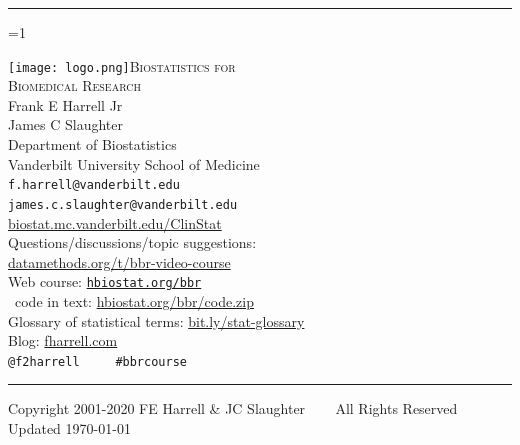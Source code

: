 \documentclass{report}
\begin{document}
\author{ }

\noindent\rule{\linewidth}{1mm}

\def\originalBBR{1}  %
\ifnum\originalBBR=1

\begin{flushright}
\Huge
\texttt{[image: logo.png]}\hfill\textsc{Biostatistics for\\Biomedical Research}\\[2ex]
\huge Frank E Harrell Jr \\ James C Slaughter \\
\Large
Department of Biostatistics \\
Vanderbilt University School of Medicine \\
\texttt{f.harrell@vanderbilt.edu} \\ \texttt{james.c.slaughter@vanderbilt.edu}
\\[2ex] \href{http://biostat.mc.vanderbilt.edu/wiki/Main/ClinStat}{biostat.mc.vanderbilt.edu/ClinStat}\\
Questions/discussions/topic suggestions: \\\href{http://datamethods.org/t/bbr-video-course}{\url{datamethods.org/t/bbr-video-course}}\\
Web course: \href{https://hbiostat.org/bbr}{\texttt{hbiostat.org/bbr}}\\
\R\ code in text: \href{http://hbiostat.org/bbr/code.zip}{hbiostat.org/bbr/code.zip}\\
Glossary of statistical terms: \url{bit.ly/stat-glossary}\\
Blog: \href{http://fharrell.com}{fharrell.com}\\
{\smaller \verb|@f2harrell     #bbrcourse|}
\\[2ex]
\small
\end{flushright}
\rule{\linewidth}{1mm}
\begin{center}
\vspace{.5in}
\small
Copyright 2001-2020 FE Harrell \& JC Slaughter ~~~ All Rights Reserved
\\ \hfill \scriptsize Updated \today
\end{center}
\end{document}
